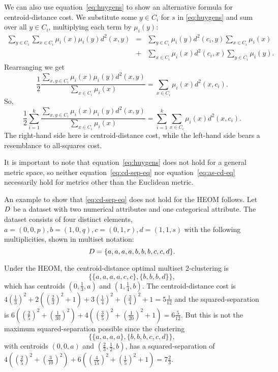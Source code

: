 We can also use equation~\eqref{eq:huygens} to show an alternative formula for
centroid-distance cost.  We substitute some $y \in C_i$ for $s$ in
\eqref{eq:huygens} and sum over all $y \in C_i$, multiplying each term by
$\mu_i(y)$:
\begin{eqnarray*}
  \sum_{y \in C_i} \sum_{x \in C_i} \mu_i(x) \mu_i(y) d^2(x,y)
  &=& \sum_{y \in C_i} \mu_i(y) d^2(c_i,y) \sum_{x \in C_i} \mu_i(x)\\
  &+& \sum_{x \in C_i} \mu_i(x) d^2(c_i,x) \sum_{y \in C_i} \mu_i(y).
\end{eqnarray*}
Rearranging we get
\begin{equation*}
  \frac{1}{2}
  \frac{\displaystyle \sum_{x,y \in C_i} \mu_i(x) \mu_i(y) d^2(x,y)}
       {\displaystyle \sum_{x \in C_i} \mu_i(x)}
  = \sum_{x \in C_i} \mu_i(x) d^2(x,c_i).
\end{equation*}
So,
\begin{equation}
  \label{eq:as-cd-eq}
  \frac{1}{2}\sum_{i=1}^{k}
  \frac{\displaystyle \sum_{x,y \in C_i} \mu_i(x) \mu_i(y) d^2(x,y)}
       {\displaystyle \sum_{x \in C_i} \mu_i(x)}
  = \sum_{i=1}^{k} \sum_{x \in C_i} \mu_i(x) d^2(x,c_i).
\end{equation}
The right-hand side here is centroid-distance cost, while the left-hand side
bears a resemblance to all-squares cost.

It is important to note that equation~\eqref{eq:huygens} does not hold for a
general metric space, so neither equation~\eqref{eq:cd-sep-eq} nor
equation~\eqref{eq:as-cd-eq} necessarily hold for metrics other than the
Euclidean metric.

An example to show that \eqref{eq:cd-sep-eq} does not hold for the HEOM
follows.  Let $D$ be a dataset with two numerical attributes and one
categorical attribute.  The dataset consists of four distinct elements,
$a=(0,0,p), b=(1,0,q), c=(0,1,r), d=(1,1,s)$ with the following
multiplicities, shown in multiset notation:
\begin{equation*}
  D = \{a,a,a,a,b,b,b,c,c,d\}.
\end{equation*}

Under the HEOM, the centroid-distance optimal multiset 2-clustering is
\begin{equation*}
  \{\{a,a,a,a,c,c\},\{b,b,b,d\}\},
\end{equation*}
which has centroids $(0,\frac{1}{3},a)$ and $(1,\frac{1}{4},b)$.  The
centroid-distance cost is $4(\frac{1}{3})^2 + 2((\frac{2}{3})^2+1) +
3(\frac{1}{4})^2 + (\frac{3}{4})^2 + 1 = 5\frac{1}{12}$ and the
squared-separation is $6((\frac{2}{5})^2+(\frac{1}{30})^2) +
4((\frac{3}{5})^2+(\frac{1}{20})^2+1) = 6\frac{5}{12}$.  But this is not the
maximum squared-separation possible since the clustering
\begin{equation*}
  \{\{a,a,a,a\},\{b,b,b,c,c,d\}\},
\end{equation*}
with centroids $(0,0,a)$ and $(\frac{2}{3},\frac{1}{2},b)$, has a
squared-separation of $4((\frac{2}{5})^2+(\frac{3}{10})^2) +
6((\frac{4}{15})^2+(\frac{1}{5})^2+1) = 7\frac{2}{3}$.

